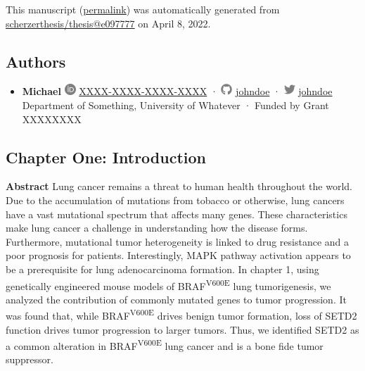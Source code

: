 This manuscript
(\href{https://scherzerthesis.github.io/thesis/v/e0977775368cdf68ea6d2822abaadc5364aa0e6b/}{permalink})
was automatically generated
from \href{https://github.com/scherzerthesis/thesis/tree/e0977775368cdf68ea6d2822abaadc5364aa0e6b}{scherzerthesis/thesis@e097777}
on April 8, 2022.

\hypertarget{authors}{%
\subsection{Authors}\label{authors}}

\begin{itemize}
\tightlist
\item
  \textbf{Michael}
  \includegraphics[width=0.16667in,height=0.16667in]{images/orcid.svg}
  \href{https://orcid.org/XXXX-XXXX-XXXX-XXXX}{XXXX-XXXX-XXXX-XXXX}
  · \includegraphics[width=0.16667in,height=0.16667in]{images/github.svg}
  \href{https://github.com/johndoe}{johndoe}
  · \includegraphics[width=0.16667in,height=0.16667in]{images/twitter.svg}
  \href{https://twitter.com/johndoe}{johndoe}
  Department of Something, University of Whatever
  · Funded by Grant XXXXXXXX
\end{itemize}

\hypertarget{chapter-one-introduction}{%
\subsection{Chapter One: Introduction}\label{chapter-one-introduction}}

\textbf{Abstract}
Lung cancer remains a threat to human health throughout the world. Due to the accumulation of mutations from tobacco or otherwise, lung cancers have a vast mutational spectrum that affects many genes. These characteristics make lung cancer a challenge in understanding how the disease forms. Furthermore, mutational tumor heterogeneity is linked to drug resistance and a poor prognosis for patients. Interestingly, MAPK pathway activation appears to be a prerequisite for lung adenocarcinoma formation. In chapter 1, using genetically engineered mouse models of BRAF\textsuperscript{V600E} lung tumorigenesis, we analyzed the contribution of commonly mutated genes to tumor progression. It was found that, while BRAF\textsuperscript{V600E} drives benign tumor formation, loss of SETD2 function drives tumor progression to larger tumors. Thus, we identified SETD2 as a common alteration in BRAF\textsuperscript{V600E} lung cancer and is a bone fide tumor suppressor.

